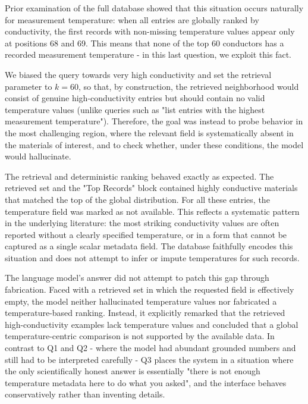 \documentclass[a4paper,fleqn]{cas-sc}
\begin{document}
Prior examination of the full database showed that this situation occurs naturally for measurement temperature: when all entries are globally ranked by conductivity, the first records with non-missing temperature values appear only at positions 68 and 69. This means that none of the top 60 conductors has a recorded measurement temperature - in this last question, we exploit this fact.

We biased the query towards very high conductivity and set the retrieval parameter to $k = 60$, so that, by construction, the retrieved neighborhood would consist of genuine high-conductivity entries but should contain no valid temperature values (unlike queries such as "list entries with the highest measurement temperature"). Therefore, the goal was instead to probe behavior in the most challenging region, where the relevant field is systematically absent in the materials of interest, and to check whether, under these conditions, the model would hallucinate.

The retrieval and deterministic ranking behaved exactly as expected. The retrieved set and the "Top Records" block contained highly conductive materials that matched the top of the global distribution. For all these entries, the temperature field was marked as not available. This reflects a systematic pattern in the underlying literature: the most striking conductivity values are often reported without a clearly specified temperature, or in a form that cannot be captured as a single scalar metadata field. The database faithfully encodes this situation and does not attempt to infer or impute temperatures for such records.

The language model's answer did not attempt to patch this gap through fabrication. Faced with a retrieved set in which the requested field is effectively empty, the model neither hallucinated temperature values nor fabricated a temperature-based ranking. Instead, it explicitly remarked that the retrieved high-conductivity examples lack temperature values and concluded that a global temperature-centric comparison is not supported by the available data. In contrast to Q1 and Q2 - where the model had abundant grounded numbers and still had to be interpreted carefully - Q3 places the system in a situation where the only scientifically honest answer is essentially "there is not enough temperature metadata here to do what you asked", and the interface behaves conservatively rather than inventing details.
\end{document}
